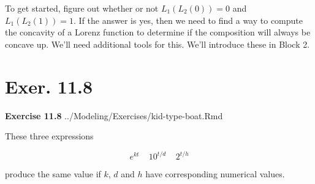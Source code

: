 \documentclass[
  letterpaper,
  DIV=11,
  numbers=noendperiod,
  oneside]{article}
\begin{document}
\begin{multicols}{2}
\begin{table}
\begin{minipage}[t]{\linewidth}
{\centering 

To get started, figure out whether or not \(L_1(L_2(0)) = 0\) and
\(L_1(L_2(1)) = 1\). If the answer is yes, then we need to find a way to
compute the concavity of a Lorenz function to determine if the
composition will always be concave up. We'll need additional tools for
this. We'll introduce these in Block 2.

}

\end{minipage}%
\newline
\begin{minipage}[t]{\linewidth}

{\centering 

\hypertarget{exer.-11.8}{%
\section*{Exer. 11.8}\label{exer.-11.8}}

\textbf{Exercise 11.8} ../Modeling/Exercises/kid-type-boat.Rmd

}

\end{minipage}%
\newline
\begin{minipage}[t]{\linewidth}

{\centering 

These three expressions

}

\end{minipage}%
\newline
\begin{minipage}[t]{\linewidth}

{\centering 

\[e^{kt}\ \ \ \ \ 10^{t/d} \  \ \ \ \  2^{t/h}\]

}

\end{minipage}%
\newline
\begin{minipage}[t]{\linewidth}

{\centering 

produce the same value if \(k\), \(d\) and \(h\) have corresponding
numerical values.

}

\end{minipage}%
\newline
\begin{minipage}[t]{\linewidth}


\end{minipage}
\end{table}
\end{multicols}
\end{document}
